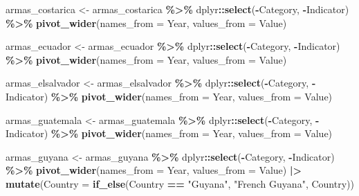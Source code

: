 \documentclass[
  11pt,
]{article}
\newenvironment{Shaded}{\begin{snugshade}}{\end{snugshade}}
\newcommand{\AttributeTok}[1]{\textcolor[rgb]{0.13,0.29,0.53}{#1}}
\newcommand{\FunctionTok}[1]{\textcolor[rgb]{0.13,0.29,0.53}{\textbf{#1}}}
\newcommand{\NormalTok}[1]{#1}
\newcommand{\OtherTok}[1]{\textcolor[rgb]{0.56,0.35,0.01}{#1}}
\newcommand{\SpecialCharTok}[1]{\textcolor[rgb]{0.81,0.36,0.00}{\textbf{#1}}}
\newcommand{\StringTok}[1]{\textcolor[rgb]{0.31,0.60,0.02}{#1}}
\begin{document}
\begin{Shaded}
\begin{Highlighting}[]
\NormalTok{armas\_costarica }\OtherTok{\textless{}{-}}\NormalTok{ armas\_costarica }\SpecialCharTok{\%\textgreater{}\%}
\NormalTok{  dplyr}\SpecialCharTok{::}\FunctionTok{select}\NormalTok{(}\SpecialCharTok{{-}}\NormalTok{Category, }\SpecialCharTok{{-}}\NormalTok{Indicator) }\SpecialCharTok{\%\textgreater{}\%}
  \FunctionTok{pivot\_wider}\NormalTok{(}\AttributeTok{names\_from =}\NormalTok{ Year, }\AttributeTok{values\_from =}\NormalTok{ Value)}

\NormalTok{armas\_ecuador }\OtherTok{\textless{}{-}}\NormalTok{ armas\_ecuador }\SpecialCharTok{\%\textgreater{}\%}
\NormalTok{  dplyr}\SpecialCharTok{::}\FunctionTok{select}\NormalTok{(}\SpecialCharTok{{-}}\NormalTok{Category, }\SpecialCharTok{{-}}\NormalTok{Indicator) }\SpecialCharTok{\%\textgreater{}\%}
  \FunctionTok{pivot\_wider}\NormalTok{(}\AttributeTok{names\_from =}\NormalTok{ Year, }\AttributeTok{values\_from =}\NormalTok{ Value)}

\NormalTok{armas\_elsalvador }\OtherTok{\textless{}{-}}\NormalTok{ armas\_elsalvador }\SpecialCharTok{\%\textgreater{}\%}
\NormalTok{  dplyr}\SpecialCharTok{::}\FunctionTok{select}\NormalTok{(}\SpecialCharTok{{-}}\NormalTok{Category, }\SpecialCharTok{{-}}\NormalTok{Indicator) }\SpecialCharTok{\%\textgreater{}\%}
  \FunctionTok{pivot\_wider}\NormalTok{(}\AttributeTok{names\_from =}\NormalTok{ Year, }\AttributeTok{values\_from =}\NormalTok{ Value)}

\NormalTok{armas\_guatemala }\OtherTok{\textless{}{-}}\NormalTok{ armas\_guatemala }\SpecialCharTok{\%\textgreater{}\%}
\NormalTok{  dplyr}\SpecialCharTok{::}\FunctionTok{select}\NormalTok{(}\SpecialCharTok{{-}}\NormalTok{Category, }\SpecialCharTok{{-}}\NormalTok{Indicator) }\SpecialCharTok{\%\textgreater{}\%}
  \FunctionTok{pivot\_wider}\NormalTok{(}\AttributeTok{names\_from =}\NormalTok{ Year, }\AttributeTok{values\_from =}\NormalTok{ Value)}

\NormalTok{armas\_guyana }\OtherTok{\textless{}{-}}\NormalTok{ armas\_guyana }\SpecialCharTok{\%\textgreater{}\%}
\NormalTok{  dplyr}\SpecialCharTok{::}\FunctionTok{select}\NormalTok{(}\SpecialCharTok{{-}}\NormalTok{Category, }\SpecialCharTok{{-}}\NormalTok{Indicator) }\SpecialCharTok{\%\textgreater{}\%}
  \FunctionTok{pivot\_wider}\NormalTok{(}\AttributeTok{names\_from =}\NormalTok{ Year, }\AttributeTok{values\_from =}\NormalTok{ Value) }\SpecialCharTok{|\textgreater{}}
  \FunctionTok{mutate}\NormalTok{(}\AttributeTok{Country =} \FunctionTok{if\_else}\NormalTok{(Country }\SpecialCharTok{==} \StringTok{"Guyana"}\NormalTok{, }\StringTok{"French Guyana"}\NormalTok{, Country))}


\end{Highlighting}
\end{Shaded}
\end{document}
